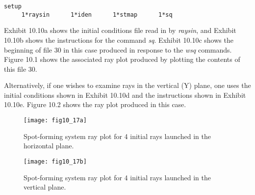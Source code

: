 \begin{footnotesize}
\begin{verbatim}
setup
     1*raysin      1*iden      1*stmap      1*sq
\end{verbatim}
\end{footnotesize}
Exhibit 10.10a shows the initial conditions file read in by {\em raysin},
and Exhibit 10.10b shows the instructions for the command {\em sq}.
Exhibit 10.10c shows the beginning of file 30 in this case produced in
response to the {\em wsq} commands.
Figure 10.1 shows the associated ray plot produced by plotting the contents of this file 30.

Alternatively, if one wishes to examine rays in the vertical (Y) plane, one
uses the initial conditions shown in Exhibit 10.10d and the instructions
shown in Exhibit 10.10e.  Figure 10.2 shows the ray plot
produced  in this case.

\newpage
\begin{figure}[htbp]
\renewcommand{\thefigure}{\thesection.\arabic{figure}}
  \centering
  \texttt{[image: fig10\_17a]}
  \caption{Spot-forming system ray plot for 4 initial rays launched in the
horizontal plane.}
\end{figure}

\newpage
\begin{figure}[htbp]
\renewcommand{\thefigure}{\thesection.\arabic{figure}}
  \centering
  \texttt{[image: fig10\_17b]}
  \caption{Spot-forming system ray plot for 4 initial rays launched in the
vertical plane.}
\end{figure}

